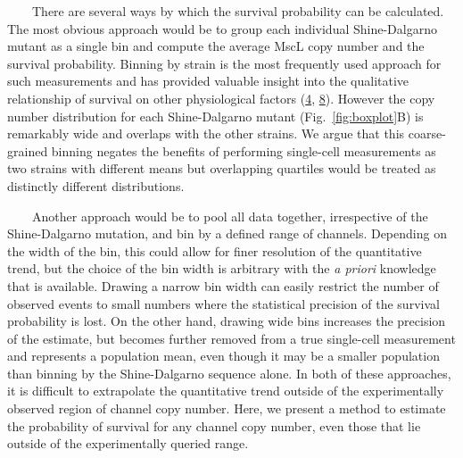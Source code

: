 ~~~~There
are
several
ways
by
which
the
survival
probability
can be
calculated.
The
most
obvious
approach
would
be to
group
each
individual
Shine-Dalgarno
mutant
as a
single
bin
and
compute
the
average
MscL
copy
number
and
the
survival
probability.
Binning
by
strain
is the
most
frequently
used
approach
for
such
measurements
and
has
provided
valuable
insight
into
the
qualitative
relationship
of
survival
on
other
physiological
factors
(\protect\hyperlink{ref-bialecka-fornal2015}{4},
\protect\hyperlink{ref-vandenberg2016}{8}).
However
the
copy
number
distribution
for
each
Shine-Dalgarno
mutant
(Fig.~\ref{fig:boxplot}B)
is
remarkably
wide
and
overlaps
with
the
other
strains.
We
argue
that
this
coarse-grained
binning
negates
the
benefits
of
performing
single-cell
measurements
as two
strains
with
different
means
but
overlapping
quartiles
would
be
treated
as
distinctly
different
distributions.

~~~~Another
approach
would
be to
pool
all
data
together,
irrespective
of the
Shine-Dalgarno
mutation,
and
bin by
a
defined
range
of
channels.
Depending
on the
width
of the
bin,
this
could
allow
for
finer
resolution
of the
quantitative
trend,
but
the
choice
of the
bin
width
is
arbitrary
with
the
\emph{a
priori}
knowledge
that
is
available.
Drawing
a
narrow
bin
width
can
easily
restrict
the
number
of
observed
events
to
small
numbers
where
the
statistical
precision
of the
survival
probability
is
lost.
On the
other
hand,
drawing
wide
bins
increases
the
precision
of the
estimate,
but
becomes
further
removed
from a
true
single-cell
measurement
and
represents
a
population
mean,
even
though
it may
be a
smaller
population
than
binning
by the
Shine-Dalgarno
sequence
alone.
In
both
of
these
approaches,
it is
difficult
to
extrapolate
the
quantitative
trend
outside
of the
experimentally
observed
region
of
channel
copy
number.
Here,
we
present
a
method
to
estimate
the
probability
of
survival
for
any
channel
copy
number,
even
those
that
lie
outside
of the
experimentally
queried
range.

